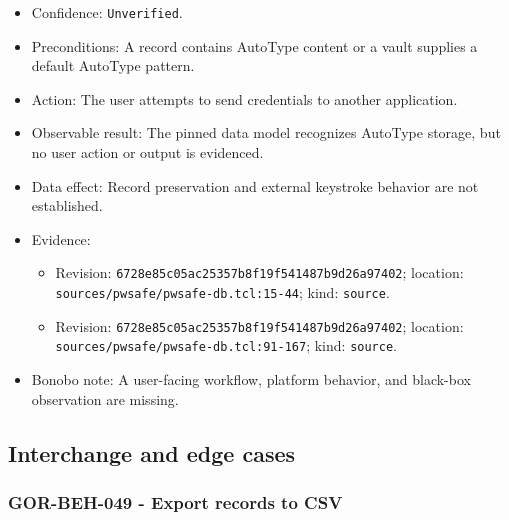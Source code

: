 \documentclass[
  letterpaper,
]{article}
\newcommand{\passthrough}[1]{#1}
\providecommand{\tightlist}{%
  \setlength{\itemsep}{0pt}\setlength{\parskip}{0pt}}
\begin{document}
\begin{itemize}
\tightlist
\item
  Confidence: \nolinkurl{Unverified}.
\item
  Preconditions: A record contains AutoType content or a vault supplies a default AutoType pattern.
\item
  Action: The user attempts to send credentials to another application.
\item
  Observable result: The pinned data model recognizes AutoType storage, but no user action or output is evidenced.
\item
  Data effect: Record preservation and external keystroke behavior are not established.
\item
  Evidence:

  \begin{itemize}
  \tightlist
  \item
    Revision: \nolinkurl{6728e85c05ac25357b8f19f541487b9d26a97402}; location:
    \nolinkurl{sources/pwsafe/pwsafe-db.tcl:15-44}; kind: \passthrough{\lstinline!source!}.
  \item
    Revision: \nolinkurl{6728e85c05ac25357b8f19f541487b9d26a97402}; location:
    \nolinkurl{sources/pwsafe/pwsafe-db.tcl:91-167}; kind: \passthrough{\lstinline!source!}.
  \end{itemize}
\item
  Bonobo note: A user-facing workflow, platform behavior, and black-box observation are missing.
\end{itemize}

\subsection{Interchange and edge cases}\label{interchange-and-edge-cases}

\subsubsection{GOR-BEH-049 - Export records to CSV}\label{gor-beh-049---export-records-to-csv}
\end{document}
